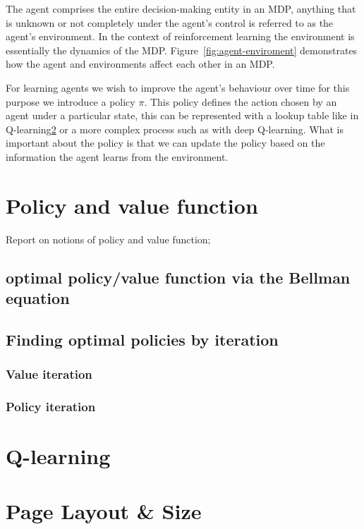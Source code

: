 \documentclass[]{final_report}
\begin{document}

The agent comprises the entire decision-making entity in an MDP, anything that is unknown or not completely under the agent's control is referred to as the agent's environment. In the context of reinforcement learning the environment is essentially the dynamics of the MDP. Figure~\ref{fig:agent-enviroment} demonstrates how the agent and environments affect each other in an MDP. 

For learning agents we wish to improve the agent's behaviour over time for this purpose we introduce a policy $\pi$. This policy defines the action chosen by an agent under a particular state, this can be represented with a lookup table like in Q-learning\ref{chap:q-learning} or a more complex process such as with deep Q-learning. What is important about the policy is that we can update the policy based on the information the agent learns from the environment. 



\chapter{Policy and value function}
Report on notions of policy and value function; 

\section{optimal policy/value function via the Bellman equation}

\section{Finding optimal policies by iteration}

\subsection{Value iteration}
\subsection{Policy iteration}


\chapter{Q-learning}\label{chap:q-learning}

\chapter{Page Layout \& Size}
\end{document}
